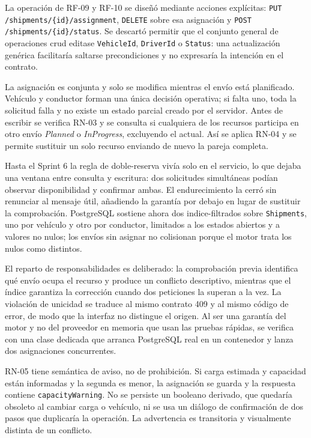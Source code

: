 La operación de RF-09 y RF-10 se diseñó mediante acciones explícitas: \texttt{PUT /shipments/\{id\}/assignment}, \texttt{DELETE} sobre esa asignación y \texttt{POST /shipments/\{id\}/status}. Se descartó permitir que el conjunto general de operaciones \gls{crud} editase \texttt{VehicleId}, \texttt{DriverId} o \texttt{Status}: una actualización genérica facilitaría saltarse precondiciones y no expresaría la intención en el contrato.

La asignación es conjunta y solo se modifica mientras el envío está planificado. Vehículo y conductor forman una única decisión operativa; si falta uno, toda la solicitud falla y no existe un estado parcial creado por el servidor. Antes de escribir se verifica RN-03 y se consulta si cualquiera de los recursos participa en otro envío \emph{Planned} o \emph{InProgress}, excluyendo el actual. Así se aplica RN-04 y se permite sustituir un solo recurso enviando de nuevo la pareja completa.

Hasta el Sprint 6 la regla de \gls{doble-reserva} vivía solo en el servicio, lo que dejaba una ventana entre consulta y escritura: dos solicitudes simultáneas podían observar disponibilidad y confirmar ambas. El endurecimiento la cerró sin renunciar al mensaje útil, añadiendo la garantía por debajo en lugar de sustituir la comprobación. PostgreSQL sostiene ahora dos \glspl{indice-filtrado} sobre \texttt{Shipments}, uno por vehículo y otro por conductor, limitados a los estados abiertos y a valores no nulos; los envíos sin asignar no colisionan porque el motor trata los nulos como distintos.

El reparto de responsabilidades es deliberado: la comprobación previa identifica qué envío ocupa el recurso y produce un conflicto descriptivo, mientras que el índice garantiza la corrección cuando dos peticiones la superan a la vez. La violación de unicidad se traduce al mismo contrato 409 y al mismo código de error, de modo que la interfaz no distingue el origen. Al ser una garantía del motor y no del proveedor en memoria que usan las pruebas rápidas, se verifica con una clase dedicada que arranca PostgreSQL real en un contenedor y lanza dos asignaciones concurrentes.

RN-05 tiene semántica de aviso, no de prohibición. Si carga estimada y capacidad están informadas y la segunda es menor, la asignación se guarda y la respuesta contiene \texttt{capacityWarning}. No se persiste un booleano derivado, que quedaría obsoleto al cambiar carga o vehículo, ni se usa un diálogo de confirmación de dos pasos que duplicaría la operación. La advertencia es transitoria y visualmente distinta de un conflicto.

